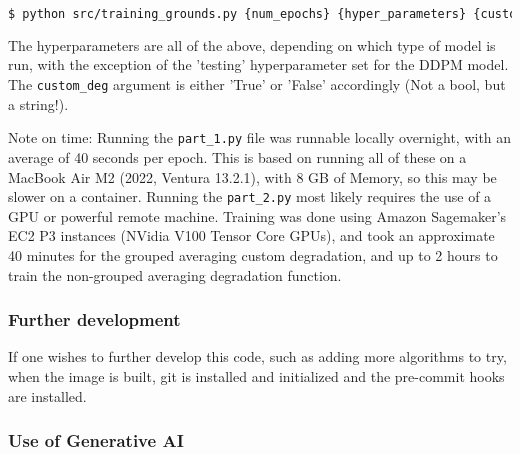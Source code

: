 \documentclass[12pt]{report} %
\begin{document}
\begin{lstlisting}[language=bash]
$ python src/training_grounds.py {num_epochs} {hyper_parameters} {custom_deg} {orientation}
\end{lstlisting}

The hyperparameters are all of the above, depending on which type of model is run, with the exception of the 'testing' hyperparameter set for the DDPM model. The \texttt{custom\_deg} argument is either 'True' or 'False' accordingly (Not a bool, but a string!).


Note on time: Running the \texttt{part\_1.py} file was runnable locally overnight, with an average of 40 seconds per epoch. This is based on running all of these on a MacBook Air M2 (2022, Ventura 13.2.1), with 8 GB of Memory, so this may be slower on a container. Running the \texttt{part\_2.py} most likely requires the use of a GPU or powerful remote machine. Training was done using Amazon Sagemaker's EC2 P3 instances (NVidia V100 Tensor Core GPUs), and took an approximate 40 minutes for the grouped averaging custom degradation, and up to 2 hours to train the non-grouped averaging degradation function.


\subsubsection{Further development}

If one wishes to further develop this code, such as adding more algorithms to try, when the image is built, git is installed and initialized and the pre-commit hooks are installed.

\subsubsection{Use of Generative AI}
\end{document}
